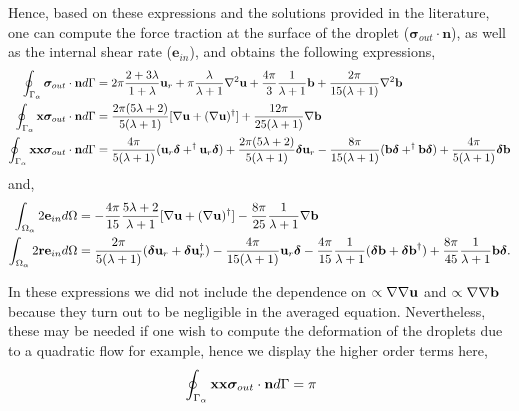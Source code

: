 Hence, based on these expressions and the solutions  provided in the literature, one can compute the force traction at the surface of the droplet ($\bm\sigma_{out}\cdot \textbf{n}$), as well as the internal shear rate ($\textbf{e}_{in}$), and obtains the following expressions, 
\begin{align}
    \oint_{\Gamma_{\alpha}} \bm\sigma_{out}\cdot \textbf{n} d\Gamma &
    =
    2\pi\frac{2+3\lambda}{1+\lambda}\textbf{u}_r
    + \pi \frac{\lambda}{\lambda +1} \mathbf{\nabla}^2 \textbf{u}
    +
    \frac{4\pi}{3}\frac{1}{\lambda +1}\textbf{b}
    + \frac{2\pi}{15(\lambda +1)}\mathbf{\nabla}^2\textbf{b}
    \\
    \oint_{\Gamma_{\alpha}}  \textbf{x}\bm\sigma_{out}\cdot \textbf{n} d\Gamma &
    =
    \frac{2\pi(5\lambda +2)}{5(\lambda +1)}[\mathbf{\nabla} \textbf{u}+ (\mathbf{\nabla} \textbf{u})^\dagger]
    + \frac{12\pi}{25(\lambda +1)} \mathbf{\nabla} \textbf{b} 
    \\
    \oint_{\Gamma_{\alpha}} \textbf{xx}\bm\sigma_{out}\cdot \textbf{n} d\Gamma &
    =
    \frac{4\pi}{5(\lambda +1)} (\textbf{u}_r \bm\delta + ^\dagger\textbf{u}_r \bm\delta)
    + \frac{2\pi(5\lambda +2)}{5(\lambda+1)}\bm\delta \textbf{u}_r
    - \frac{8\pi}{15(\lambda +1)} ( \textbf{b}\bm\delta + ^\dagger\textbf{b}\bm\delta )
    + \frac{4\pi}{5(\lambda+1)}\bm\delta \textbf{b}
\end{align}
and, 
\begin{align}
    \int_{\Omega_{\alpha}} 2\textbf{e}_{in} d\Omega
    &=
    -\frac{4\pi}{15}\frac{5\lambda +2}{\lambda+1}
    [\mathbf{\nabla} \textbf{u}+ (\mathbf{\nabla} \textbf{u})^\dagger]
    - \frac{8\pi}{25}\frac{1}{\lambda+1}
    \mathbf{\nabla}\textbf{b}
    \\
    \int_{\Omega_{\alpha}} 2\textbf{r}\textbf{e}_{in} d\Omega
    &=
    \frac{2\pi}{5(\lambda+1)}
    (\bm\delta \textbf{u}_r +  \bm\delta\textbf{u}_r^\dagger)
    -\frac{4\pi}{15(\lambda+1)}\textbf{u}_r\bm\delta 
    -\frac{4\pi}{15}\frac{1}{\lambda+1}
    (\bm\delta \textbf{b} +  \bm\delta\textbf{b}^\dagger)
    +\frac{8\pi}{45}\frac{1}{\lambda+1}
    \textbf{b}\bm\delta. 
\end{align}

In these expressions we did not include the dependence on $\propto \mathbf{\nabla}\mathbf{\nabla} \textbf{u}$ and $\propto \mathbf{\nabla}\mathbf{\nabla} \textbf{b}$ because they turn out to be negligible in the averaged equation. 
Nevertheless, these may be needed if one wish to compute the deformation of the droplets due to a quadratic flow for example, hence we display the higher order terms here, 
\begin{align}
    \oint_{\Gamma_{\alpha}} \textbf{xx}\bm\sigma_{out}\cdot \textbf{n} d\Gamma &
    =
    \pi \frac{}{}
\end{align}


